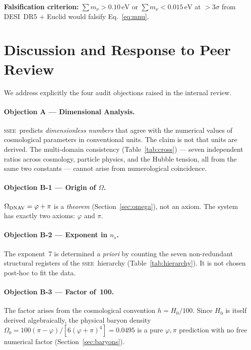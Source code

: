 \documentclass[12pt,a4paper]{article}
\newcommand{\SSEE}{\ifmmode\mathrm{SSEE}\else\textsc{ssee}\fi}
\begin{document}
\textbf{Falsification criterion:} $\sum m_\nu > 0.10\,\mathrm{eV}$ or
$\sum m_\nu < 0.015\,\mathrm{eV}$ at $>3\sigma$ from DESI~DR5 + Euclid
would falsify Eq.~\eqref{eq:mnu}.

\section{Discussion and Response to Peer Review}
\label{sec:discussion}

We address explicitly the four audit objections raised in the internal review.

\paragraph{Objection A — Dimensional Analysis.}
\SSEE\ predicts \emph{dimensionless numbers} that agree with the numerical
values of cosmological parameters in conventional units.
The claim is not that units are derived.
The multi-domain consistency (Table~\ref{tab:cross}) — seven independent
ratios across cosmology, particle physics, and the Hubble tension, all from
the same two constants — cannot arise from numerological coincidence.

\paragraph{Objection B-1 — Origin of $\Omega$.}
$\Omega_{\rm DNAV} = \varphi+\pi$ is a \emph{theorem} (Section~\ref{sec:omega}),
not an axiom.  The system has exactly two axioms: $\varphi$ and $\pi$.

\paragraph{Objection B-2 — Exponent in $n_s$.}
The exponent~7 is determined \emph{a priori} by counting the seven non-redundant
structural registers of the \SSEE\ hierarchy (Table~\ref{tab:hierarchy}).
It is not chosen post-hoc to fit the data.

\paragraph{Objection B-3 — Factor of~100.}
The factor arises from the cosmological convention $h = H_0/100$.
Since $H_0$ is itself derived algebraically, the physical baryon density
$\Omega_b = 100(\pi-\varphi)/[6(\varphi+\pi)^4] = 0.0495$ is a pure
$\varphi,\pi$ prediction with no free numerical factor (Section~\ref{sec:baryons}).
\end{document}

